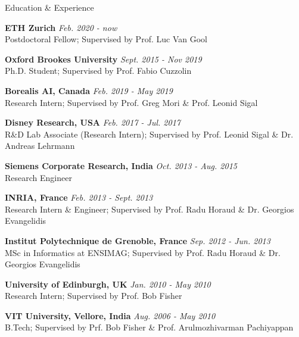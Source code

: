 \documentclass{resume} %
\begin{document}

\begin{rSection}{Education \& Experience}

{\bf \footnotesize{ETH Zurich}} \hfill {\em Feb. 2020 - now} 
\\ \footnotesize{Postdoctoral Fellow}; \footnotesize{Supervised by Prof. Luc Van Gool}

{\bf \footnotesize{Oxford Brookes University}} \hfill {\em Sept. 2015 - Nov 2019} 
\\ \footnotesize{Ph.D. Student}; \footnotesize{Supervised by Prof. Fabio Cuzzolin}

{\bf \footnotesize{Borealis AI, Canada}} \hfill {\em \footnotesize{Feb. 2019 - May 2019}} 
\\ \footnotesize{Research Intern}; \footnotesize{Supervised by Prof. Greg Mori \& Prof. Leonid Sigal}

{\bf \footnotesize{Disney Research, USA}} \hfill {\em \footnotesize{Feb. 2017 - Jul. 2017}} 
\\ \footnotesize{R\&D Lab Associate (Research Intern)}; \footnotesize{Supervised by Prof. Leonid Sigal \& Dr. Andreas Lehrmann}

{\bf \footnotesize{Siemens Corporate Research, India}} \hfill {\em \footnotesize{Oct. 2013 - Aug. 2015}} 
\\ \footnotesize{Research Engineer}

{\bf INRIA, France} \hfill {\em Feb. 2013 - Sept. 2013} 
\\ \footnotesize{Research Intern \& Engineer}; \footnotesize{Supervised by Prof. Radu Horaud \& Dr. Georgios Evangelidis}

{\bf Institut Polytechnique de Grenoble, France} \hfill {\em Sep. 2012 - Jun. 2013} 
\\ \footnotesize{MSc in Informatics at ENSIMAG}; \footnotesize{Supervised by Prof. Radu Horaud \& Dr. Georgios Evangelidis}

{\bf \footnotesize{University of Edinburgh, UK}} \hfill {\em \footnotesize{Jan. 2010 - May 2010}} 
\\ \footnotesize{Research Intern}; \footnotesize{Supervised by Prof. Bob Fisher}

{\bf VIT University, Vellore, India} \hfill {\em Aug. 2006 - May 2010} 
\\ \footnotesize{B.Tech}; \footnotesize{Supervised by Prf. Bob Fisher \& Prof. Arulmozhivarman Pachiyappan}
\end{rSection}
\end{document}
